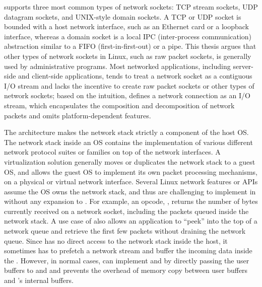\label{sec:libos:socket}

\thelibos{} supports three most common types of network sockets: TCP stream sockets, UDP datagram sockets, and UNIX-style domain sockets.
A TCP or UDP socket is bounded with a host network interface,
such as an Ethernet card or a loopback interface,
whereas a domain socket is a local IPC (inter-process communication) abstraction
similar to a FIFO (first-in-first-out) or a pipe.
This thesis argues that other types of network sockets
in Linux, such as raw packet sockets, is generally used by administrative programs.
Most networked applications, including server-side and client-side applications, tends to treat a network socket
as a contiguous I/O stream and lacks the incentive to create raw packet sockets or other types of network sockets; based on the intuition,
\thehostabi{} defines a network connection as an I/O stream, which encapsulates the composition and decomposition of network packets
and omits platform-dependent features.

The \graphene{} architecture makes the network stack strictly a component of the host OS.
The network stack inside an OS contains the implementation of various different network protocol suites or families on top of the network interfaces.
A virtualization solution generally moves or duplicates
the network stack to a guest OS,
and allows the guest OS to implement its own packet processing mechanisms,
on a physical or virtual network interface.
Several Linux network features or APIs assume
the OS owns the network stack, and thus are challenging to implement in \thelibos{}
without any expansion to \thehostabi{}.
For example,
an  opcode, ,
returns the number of bytes currently received on a network socket, including the packets queued inside the network stack. 
A use case of  also allows an application
to ``peek'' into the top of a network queue
and retrieve the first few packets without draining the network queue.
Since \thelibos{} has no direct access to the network stack
inside the host,
it sometimes has to prefetch a network stream
and buffer the incoming data inside the \picoproc{}.
However, in normal cases, \thelibos{} can implement  and  by directly passing the user buffers to  and  and prevents the overhead of memory copy between user buffers and \thelibos{}'s internal buffers. 




